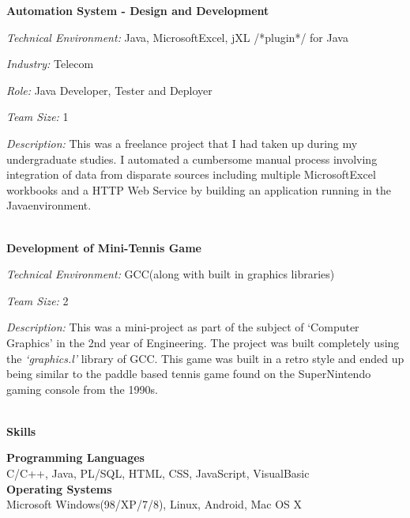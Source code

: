 \documentclass[a4paper,12pt,final]{memoir}
\newcommand{\Sep}{\vspace{1.5em}}
\newcommand{\SmallSep}{\vspace{0.5em}}
\newcommand{\CVSection}[1]
	{\Large\textbf{#1}\par
	\SmallSep\normalsize\normalfont}
\newcommand{\CVItem}[1]
	{\textbf{\color{Plum} #1}}
\begin{document}
\CVItem{Automation System - Design and Development}\SmallSep\\
\begin{minipage}{13cm}
	\begin{compactitem}[\color{Plum}$\circ$]
		{\footnotesize
			\item \emph{Technical Environment:} Java\texttrademark, Microsoft\textcopyright Excel, jXL /*plugin*/ for Java
			\item \emph{Industry:} Telecom
			\item \emph{Role:} Java Developer, Tester and Deployer
			\item \emph{Team Size:} 1
			\item \emph{Description:} This was a freelance project that I had taken up during my undergraduate studies. I automated a cumbersome manual process involving integration of data from disparate sources including multiple Microsoft\textcopyright Excel workbooks and a HTTP Web Service by building an application running in the Java\texttrademark environment.
		}
	\end{compactitem}
\end{minipage}
\SmallSep\\

\CVItem{Development of Mini-Tennis Game}\SmallSep\\
\begin{minipage}{13cm}
	\begin{compactitem}[\color{Plum}$\circ$]
		{\footnotesize
			\item \emph{Technical Environment:} GCC(along with built in graphics libraries)
			\item \emph{Team Size:} 2
			\item \emph{Description:} This was a mini-project as part of the subject of `Computer Graphics' in the 2nd year of Engineering. The project was built completely using the \emph{`graphics.l'} library of GCC. This game was built in a retro style and ended up being similar to the paddle based tennis game found on the SuperNintendo gaming console from the 1990s.
		}
	\end{compactitem}
\end{minipage}
\Sep\\

\CVSection{Skills}
\CVItem{Programming Languages}\\
{\footnotesize C/C++, Java, PL/SQL, HTML, CSS, JavaScript, VisualBasic}
\SmallSep\\
\CVItem{Operating Systems}\\
{\footnotesize Microsoft Windows(98/XP/7/8), Linux, Android, Mac OS X}
\SmallSep\\
\end{document}

